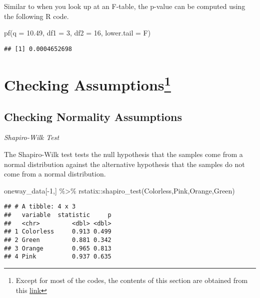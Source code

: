 \documentclass[
]{book}
\newenvironment{Shaded}{\begin{snugshade}}{\end{snugshade}}
\newcommand{\AttributeTok}[1]{\textcolor[rgb]{0.77,0.63,0.00}{#1}}
\newcommand{\DecValTok}[1]{\textcolor[rgb]{0.00,0.00,0.81}{#1}}
\newcommand{\FloatTok}[1]{\textcolor[rgb]{0.00,0.00,0.81}{#1}}
\newcommand{\FunctionTok}[1]{\textcolor[rgb]{0.00,0.00,0.00}{#1}}
\newcommand{\NormalTok}[1]{#1}
\newcommand{\SpecialCharTok}[1]{\textcolor[rgb]{0.00,0.00,0.00}{#1}}
\begin{document}
Similar to when you look up at an F-table, the p-value can be computed using the following R code.

\begin{Shaded}
\begin{Highlighting}[]
\FunctionTok{pf}\NormalTok{(}\AttributeTok{q =} \FloatTok{10.49}\NormalTok{, }\AttributeTok{df1 =} \DecValTok{3}\NormalTok{, }\AttributeTok{df2 =} \DecValTok{16}\NormalTok{, }\AttributeTok{lower.tail =}\NormalTok{ F)}
\end{Highlighting}
\end{Shaded}

\begin{verbatim}
## [1] 0.0004652698
\end{verbatim}

\hypertarget{checking-assumptions}{%
\chapter[Checking Assumptions]{\texorpdfstring{Checking Assumptions\footnote{Except for most of the codes, the contents of this section are obtained from this \href{https://yieldingresults.org/wp-content/uploads/2015/03/Checking_ANOVA_assumptions.html}{link}}}{Checking Assumptions}}\label{checking-assumptions}}

\hypertarget{checking-normality-assumptions}{%
\section{Checking Normality Assumptions}\label{checking-normality-assumptions}}

\emph{Shapiro-Wilk Test}

The Shapiro-Wilk test tests the null hypothesis that the samples come from a normal distribution against the alternative hypothesis that the samples do not come from a normal distribution.

\begin{Shaded}
\begin{Highlighting}[]
\NormalTok{oneway\_data[}\SpecialCharTok{{-}}\DecValTok{1}\NormalTok{,] }\SpecialCharTok{\%\textgreater{}\%} 
\NormalTok{  rstatix}\SpecialCharTok{::}\FunctionTok{shapiro\_test}\NormalTok{(Colorless,Pink,Orange,Green)}
\end{Highlighting}
\end{Shaded}

\begin{verbatim}
## # A tibble: 4 x 3
##   variable  statistic     p
##   <chr>         <dbl> <dbl>
## 1 Colorless     0.913 0.499
## 2 Green         0.881 0.342
## 3 Orange        0.965 0.813
## 4 Pink          0.937 0.635
\end{verbatim}
\end{document}
